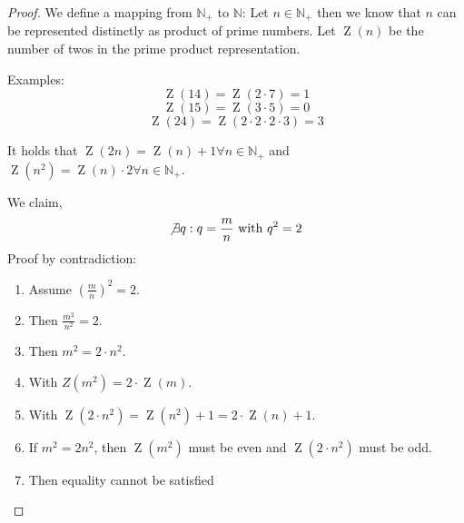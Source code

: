 \documentclass[a4paper,landscape,twocolumn]{article}
\theoremstyle{definition}
\begin{document}
\begin{proof}
  We define a mapping from $\mathbb N_+$ to $\mathbb N$:
  Let $n \in \mathbb N_+$ then we know that $n$ can be represented distinctly
  as product of prime numbers. Let $\operatorname{Z}(n)$ be the number of twos
  in the prime product representation.

  Examples:
  \[ \operatorname{Z}(14) = \operatorname{Z}(2 \cdot 7) = 1 \]
  \[ \operatorname{Z}(15) = \operatorname{Z}(3 \cdot 5) = 0 \]
  \[ \operatorname{Z}(24) = \operatorname{Z}(2 \cdot 2 \cdot 2 \cdot 3) = 3 \]

  It holds that $\operatorname{Z}(2n) = \operatorname{Z}(n) + 1 \forall n \in \mathbb N_+$
  and $\operatorname{Z}(n^2) = \operatorname{Z}(n) \cdot 2 \forall n \in \mathbb N_+$.

  We claim,
  \[ \not\exists q: q = \frac mn \text{ with } q^2 = 2 \]
  Proof by contradiction:
  \begin{enumerate}
    \item Assume $\left(\frac mn\right)^2 = 2$.
    \item Then $\frac{m^2}{n^2} = 2$.
    \item Then $m^2 = 2 \cdot n^2$.
    \item With $Z(m^2) = 2\cdot \operatorname{Z}(m)$.
    \item With $\operatorname{Z}(2\cdot n^2) = \operatorname{Z}(n^2) + 1 = 2 \cdot \operatorname{Z}(n) + 1$.
    \item If $m^2 = 2n^2$, then $\operatorname{Z}(m^2)$ must be even and $\operatorname{Z}(2\cdot n^2)$ must be odd.
    \item Then equality cannot be satisfied \lightning
  \end{enumerate}
\end{proof}
\end{document}
